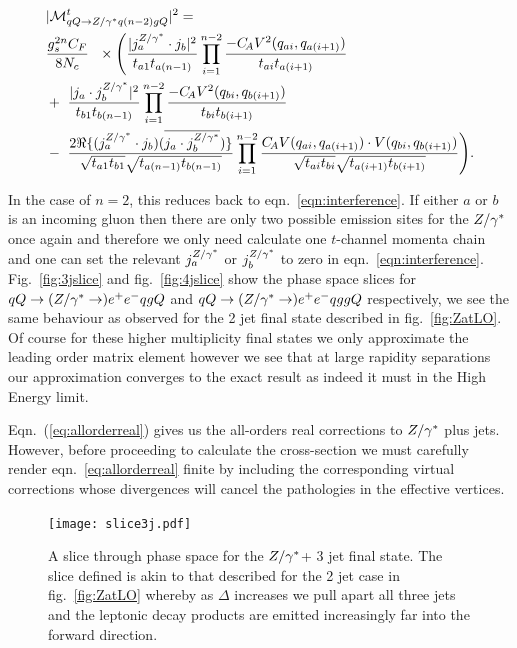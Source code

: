 		\begin{align}
		\begin{split}
		    &|\mathcal{M}^{t}_{qQ\to Z/\gamma^* q(n-2)gQ}|^2 = \\&\frac{g_s^{2n}C_F}{8N_c}\
		    \ \times \Bigg( \frac{| j_a^{Z/\gamma^*}\cdot j_b|^2}{t_{a1}t_{a(n-1)}} \prod^{n-2}_{i=1} \frac{-C_{\!A} V^2(q_{ai},
		      q_{a(i+1)})}{t_{ai} t_{a(i+1)}}  \\ & + \ \frac{|j_a \cdot j_b^{Z/\gamma^*} |^2}{t_{b1}t_{b(n-1)}}
		    \prod^{n-2}_{i=1}\frac{-C_{\!A} V^2(q_{bi}, q_{b(i+1)})}{t_{bi} t_{b(i+1)}}  \\
		    &-\ \frac{2\Re\{(j_a^{Z/\gamma^*}\cdot j_b)(\overline{j_a \cdot
		        j_b^{Z/\gamma^*}})\}}{\sqrt{t_{a1}t_{b1}}\sqrt{t_{a(n-1)} t_{b(n-1)}}}
		    \prod^{n-2}_{i=1}\frac{C_{\!A} V(q_{ai}, q_{a(i+1)})\cdot V(q_{bi},
		      q_{b(i+1)})}{\sqrt{t_{ai}t_{bi}} \sqrt{t_{a(i+1)}t_{b(i+1)}}}\Bigg).
			\label{eq:allorderreal}
		\end{split}
		\end{align}

		In the case of $n=2$, this reduces back to eqn.~\eqref{eqn:interference}.  If
		either $a$ or $b$ is an incoming gluon then there are only two possible emission sites
		for the $Z/\gamma^*$ once again and therefore we only need calculate one $t$-channel momenta chain
		and one can set the relevant $j_a^{Z/\gamma^*}$ or $j_b^{Z/\gamma^*}$ to
		zero in eqn.~\eqref{eqn:interference}.  Fig.~\eqref{fig:3jslice} and fig.~\eqref{fig:4jslice}
		show the phase space slices for $qQ\to(Z/\gamma^*\to)e^+e^-qgQ$ and $qQ\to(Z/\gamma^*\to)e^+e^-qggQ$
		respectively, we see the same behaviour as observed for the 2 jet final state described in
		fig.~\eqref{fig:ZatLO}.  Of course for these higher multiplicity final states we only
		approximate the leading order matrix element however we see that at large rapidity separations
		our approximation converges to the exact result as indeed it must in the High Energy limit.

		Eqn.~(\eqref{eq:allorderreal}) gives us the all-orders real corrections to $Z/\gamma^*$ plus jets.
		However, before proceeding to calculate the cross-section we must carefully render eqn.~\eqref{eq:allorderreal}
		finite by including the corresponding virtual corrections whose divergences will cancel the pathologies
		in the effective vertices.

		\begin{figure}[hbt]
		  \begin{center}
		    \texttt{[image: slice3j.pdf]}
		    \caption{A slice through phase space for the $Z/\gamma^*$+ 3 jet final state.  The slice defined is
		    akin to that described for the 2 jet case in fig.~\eqref{fig:ZatLO} whereby as $\Delta$ increases
		    we pull apart all three jets and the leptonic decay products are emitted increasingly far into
		    the forward direction.}
		    \label{fig:3jslice}
		  \end{center}
		\end{figure}

